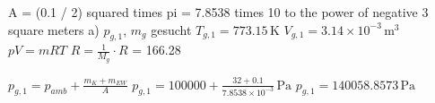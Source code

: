 A = (0.1 / 2) squared times pi = 7.8538 times 10 to the power of negative 3 square meters  
a) \( p_{g,1} \), \( m_g \) gesucht  
\( T_{g,1} = 773.15 \, \text{K} \)  
\( V_{g,1} = 3.14 \times 10^{-3} \, \text{m}^3 \)  
\( pV = mRT \)  
\( R = \frac{1}{M_g} \cdot R \) = 166.28 \,   

\( p_{g,1} = p_{amb} + \frac{m_K + m_{EW}}{A} \)  
\( p_{g,1} = 100000 + \frac{32 + 0.1}{7.8538 \times 10^{-3}} \, \text{Pa} \)  
\( p_{g,1} = 140058.8573 \, \text{Pa} \)